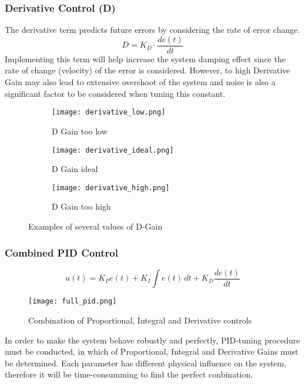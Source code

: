 \subsubsection{Derivative Control (D)}
The derivative term predicts future errors by considering the rate of error change.
$$D = K_D\cdot\frac{d e(t)}{dt}$$
Implementing this term will help increase the system damping effect since the rate of change (velocity) of the error is considered.
However, to high Derivative Gain may also lead to extensive overshoot of the system and noise is also a significant factor to be considered when tuning this constant.
\begin{figure}[H]
  \centering
  \begin{subfigure}[b]{0.3\textwidth}
    \texttt{[image: derivative\_low.png]}
    \caption{D Gain too low}
  \end{subfigure}
  \begin{subfigure}[b]{0.3\textwidth}
    \texttt{[image: derivative\_ideal.png]}
    \caption{D Gain ideal}
  \end{subfigure}
  \begin{subfigure}[b]{0.3\textwidth}
    \texttt{[image: derivative\_high.png]}
    \caption{D Gain too high}
  \end{subfigure}
  \caption{Examples of several values of D-Gain}
\end{figure}

\subsubsection{Combined PID Control}
$$u(t) = K_P e(t) + K_I \int e(t) \, dt + K_D \frac{d e(t)}{dt}$$

\begin{wrapfigure}{l}{0.3\textwidth}
  \centering
  \addtolength{\belowcaptionskip}{-3ex}
  \texttt{[image: full\_pid.png]}
  \caption{Combination of Proportional, Integral and Derivative controls}
\end{wrapfigure}

\noindent
In order to make the system behave robustly and perfectly, PID-tuning procedure must be conducted, in which of Proportional, Integral and Derivative Gains must be determined. Each parameter has different physical influence on the system, therefore it will be time-consumming to find the perfect conbination.

